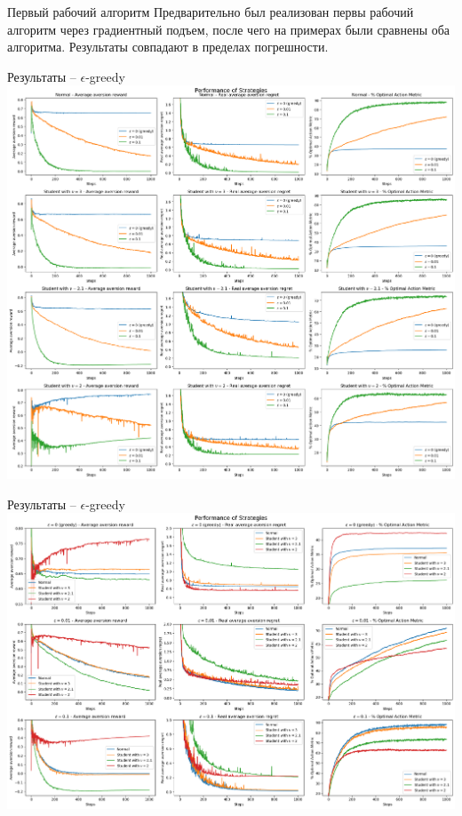 \documentclass[11pt]{beamer} %
\begin{document}
    \begin{frame}{Первый рабочий алгоритм}
        Предварительно был реализован первы рабочий алгоритм через градиентный подъем, после чего на примерах были сравнены оба алгоритма. Результаты совпадают в пределах погрешности.
    \end{frame}
    \begin{frame}{Результаты -- $\epsilon$-greedy}
        \includegraphics[scale=0.13,center]{images/theory_images/epsilon_greedy/one_distr.png}
    \end{frame}
    \begin{frame}{Результаты -- $\epsilon$-greedy}
        \includegraphics[scale=0.13,center]{images/theory_images/epsilon_greedy/one_strat.png}
    \end{frame}
\end{document}
